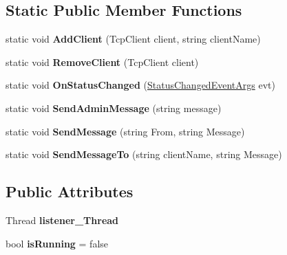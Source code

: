 \subsection*{Static Public Member Functions}
\begin{DoxyCompactItemize}
\item 
\hypertarget{class_t_c_p_server_library_1_1_t_c_p_server_a27a7ca9b3f0fe4a1a9b36eeab3570f2b}{
static void {\bfseries AddClient} (TcpClient client, string clientName)}
\label{class_t_c_p_server_library_1_1_t_c_p_server_a27a7ca9b3f0fe4a1a9b36eeab3570f2b}

\item 
\hypertarget{class_t_c_p_server_library_1_1_t_c_p_server_a4850f94a7916d1974db988f3a5c61e81}{
static void {\bfseries RemoveClient} (TcpClient client)}
\label{class_t_c_p_server_library_1_1_t_c_p_server_a4850f94a7916d1974db988f3a5c61e81}

\item 
\hypertarget{class_t_c_p_server_library_1_1_t_c_p_server_accfc4c76cfdb7a3673721a3be08142be}{
static void {\bfseries OnStatusChanged} (\hyperlink{class_t_c_p_server_library_1_1_status_changed_event_args}{StatusChangedEventArgs} evt)}
\label{class_t_c_p_server_library_1_1_t_c_p_server_accfc4c76cfdb7a3673721a3be08142be}

\item 
\hypertarget{class_t_c_p_server_library_1_1_t_c_p_server_ae0d0c1faa70a43a22eeb65c196eda5e3}{
static void {\bfseries SendAdminMessage} (string message)}
\label{class_t_c_p_server_library_1_1_t_c_p_server_ae0d0c1faa70a43a22eeb65c196eda5e3}

\item 
\hypertarget{class_t_c_p_server_library_1_1_t_c_p_server_a1058a09f921244ccb755f1c26fc83e12}{
static void {\bfseries SendMessage} (string From, string Message)}
\label{class_t_c_p_server_library_1_1_t_c_p_server_a1058a09f921244ccb755f1c26fc83e12}

\item 
\hypertarget{class_t_c_p_server_library_1_1_t_c_p_server_a6da75375654466ceb90af8970e07a77f}{
static void {\bfseries SendMessageTo} (string clientName, string Message)}
\label{class_t_c_p_server_library_1_1_t_c_p_server_a6da75375654466ceb90af8970e07a77f}

\end{DoxyCompactItemize}
\subsection*{Public Attributes}
\begin{DoxyCompactItemize}
\item 
\hypertarget{class_t_c_p_server_library_1_1_t_c_p_server_acb48feea47330b1333bf14802f009565}{
Thread {\bfseries listener\_\-Thread}}
\label{class_t_c_p_server_library_1_1_t_c_p_server_acb48feea47330b1333bf14802f009565}

\item 
\hypertarget{class_t_c_p_server_library_1_1_t_c_p_server_ae21458ec8ee3fc5f0f7c3abfff5e6dae}{
bool {\bfseries isRunning} = false}
\label{class_t_c_p_server_library_1_1_t_c_p_server_ae21458ec8ee3fc5f0f7c3abfff5e6dae}

\end{DoxyCompactItemize}
